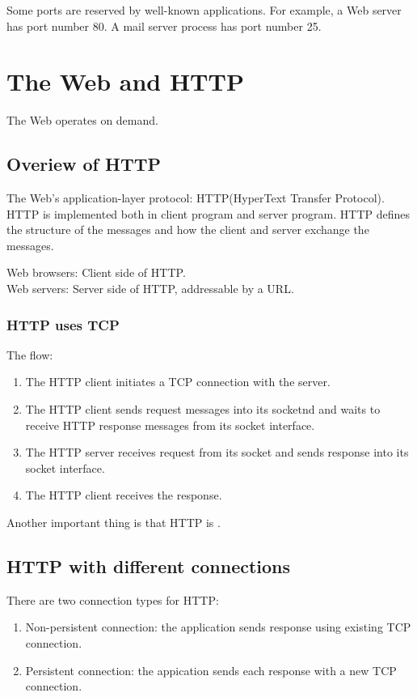 Some ports are reserved by well-known applications. For example, a Web server has port number 80. A mail server process has port number 25.


\newpage
\section{The Web and HTTP}

\hf
The Web operates on demand.
\subsection{Overiew of HTTP}

The Web's application-layer protocol: HTTP(HyperText Transfer Protocol). HTTP is implemented both in client program and server program.
HTTP defines the structure of the messages and how the client and server exchange the messages.\\
\begin{center}
    Web browsers: Client side of HTTP.\\
    Web servers: Server side of HTTP, addressable by a URL.
\end{center}


\subsubsection{HTTP uses TCP}

\hf
The flow:
\begin{enumerate}
    \item The HTTP client initiates a TCP connection with the server.
    \item The HTTP client sends request messages into its socketnd and waits to receive HTTP response messages from its socket interface.
    \item The HTTP server receives request from its socket and sends response into its socket interface.
    \item The HTTP client receives the response.
\end{enumerate}

Another important thing is that HTTP is .


\subsection{HTTP with different connections}

\hf
There are two connection types for HTTP:
\begin{enumerate}
    \item Non-persistent connection: the application sends response using existing TCP connection.
    \item Persistent connection: the appication sends each response with a new TCP connection.
\end{enumerate}

